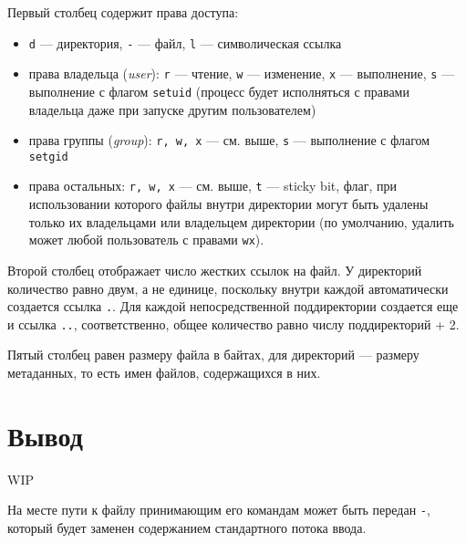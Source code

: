 \documentclass[listings]{labreport}
\begin{document}
Первый столбец содержит права доступа:
\begin{itemize}
\item \texttt{d} — директория, \texttt{-} — файл, \texttt{l} — символическая ссылка
\item права владельца (\textit{user}): \texttt{r} — чтение, \texttt{w} — изменение, \texttt{x} — выполнение,
  \texttt{s} — выполнение с флагом \texttt{setuid} (процесс будет исполняться с правами владельца даже при запуске другим пользователем)
\item права группы (\textit{group}): \texttt{r, w, x} — см. выше, \texttt{s} — выполнение с флагом \texttt{setgid}
\item права остальных: \texttt{r, w, x} — см. выше, \texttt{t} — sticky bit, флаг, при использовании которого файлы внутри директории
  могут быть удалены только их владельцами или владельцем директории (по умолчанию, удалить может любой пользователь с правами \texttt{wx}).
\end{itemize}

Второй столбец отображает число жестких ссылок на файл. У директорий количество равно двум, а не единице, поскольку внутри
каждой автоматически создается ссылка \texttt{.}. Для каждой непосредственной поддиректории создается еще и ссылка \texttt{..},
соответственно, общее количество равно числу поддиректорий + 2.

Пятый столбец равен размеру файла в байтах, для директорий — размеру метаданных, то есть имен файлов, содержащихся в них.

\section*{Вывод}

WIP

На месте пути к файлу принимающим его командам может быть передан \texttt{-}, который будет заменен
содержанием стандартного потока ввода.
\end{document}
